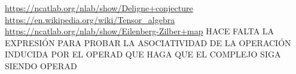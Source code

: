 \documentclass[TFM.tex]{subfiles}
\begin{document}


\url{https://ncatlab.org/nlab/show/Deligne+conjecture}
\url{https://en.wikipedia.org/wiki/Tensor_algebra}
\url{https://ncatlab.org/nlab/show/Eilenberg-Zilber+map} HACE FALTA LA EXPRESIÓN PARA PROBAR LA ASOCIATIVIDAD DE LA OPERACIÓN INDUCIDA POR EL OPERAD QUE HAGA QUE EL COMPLEJO SIGA SIENDO OPERAD
\end{document}
